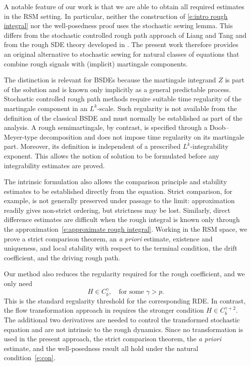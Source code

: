 \documentclass[11pt,reqno]{amsart}
\numberwithin{equation}{section}
\begin{document}
A notable feature of our work is that we are able to obtain all required estimates in the RSM setting. In particular, neither the
construction of \eqref{e:intro rough integral} nor the well-posedness proof
uses the stochastic sewing lemma. This differs from the stochastic
controlled rough path approach of Liang and Tang
\cite{liang2025multidimensional} and from the rough SDE theory developed in
\cite{fhl21,allan2024rough}. The present work therefore provides an original alternative to stochastic sewing for natural classes of equations that combine rough signals with (implicit) martingale components.

The distinction is relevant for BSDEs because the martingale integrand $Z$
is part of the solution and is known only implicitly as a general predictable process. Stochastic controlled
rough path methods require suitable time regularity of the martingale
component in an $L^k$-scale. Such regularity is not available from the
definition of the classical BSDE and must normally be established as part of the
analysis. A rough semimartingale, by contrast, is specified through a
Doob--Meyer-type decomposition and does not impose time regularity on its
martingale part. Moreover, its definition is independent of a prescribed
$L^k$-integrability exponent. This allows the notion of solution to be
formulated before any integrability estimates are proved.

The intrinsic formulation also allows the comparison principle and stability estimates
to be established directly from the equation. Strict comparison, for example, is
not generally preserved under passage to the limit: approximation readily
gives non-strict ordering, but strictness may be lost. Similarly, direct
difference estimates are difficult when the rough integral is known only
through the approximation~\eqref{e:approximate rough integral}. Working in the RSM space, we
prove a strict comparison theorem, an \emph{a priori} estimate, existence
and uniqueness, and local stability with respect to the terminal condition,
the drift coefficient, and the driving rough path.

Our method also reduces the regularity required for the rough coefficient, and we only need 
\begin{equation}\label{e:con}
H\in C_b^\gamma, \quad 
 \text{for some } \gamma>p.
\end{equation}
This is the standard regularity threshold for the corresponding RDE. In contrast, the flow transformation approach in \cite{DF} requires the stronger condition
$H\in C_b^{\gamma+2}$. The additional two derivatives are needed to control
the transformed stochastic equation and are not intrinsic to the rough
dynamics. Since no transformation is used in the present approach, the strict comparison
theorem, the \emph{a priori} estimate, and the well-posedness result all hold
under the natural condition~\eqref{e:con}.
\end{document}
